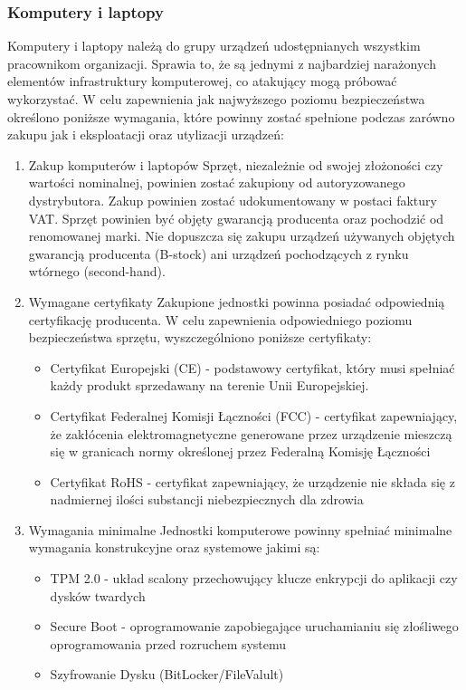 \documentclass[12pt,a4paper]{article}
\begin{document}
\subsubsection{Komputery i laptopy}\label{komputery-i-laptopy}
Komputery i laptopy należą do grupy urządzeń udostępnianych wszystkim pracownikom organizacji. Sprawia to, że są jednymi z najbardziej narażonych elementów infrastruktury komputerowej, co atakujący mogą próbować wykorzystać. W celu zapewnienia jak najwyższego poziomu bezpieczeństwa określono poniższe wymagania, które powinny zostać spełnione podczas zarówno zakupu jak i eksploatacji oraz utylizacji urządzeń:
\begin{enumerate}
    \item Zakup komputerów i laptopów Sprzęt, niezależnie od swojej złożoności czy wartości nominalnej, powinien zostać zakupiony od autoryzowanego dystrybutora. Zakup powinien zostać udokumentowany w postaci faktury VAT. Sprzęt powinien być objęty gwarancją producenta oraz pochodzić od renomowanej marki. Nie dopuszcza się zakupu urządzeń używanych objętych gwarancją producenta (B-stock) ani urządzeń pochodzących z rynku wtórnego (second-hand).
    
    \item Wymagane certyfikaty Zakupione jednostki powinna posiadać odpowiednią certyfikację producenta. W celu zapewnienia odpowiedniego poziomu bezpieczeństwa sprzętu, wyszczególniono poniższe certyfikaty:
        \begin{itemize}
            \item Certyfikat Europejski (CE) - podstawowy certyfikat, który musi spełniać każdy produkt sprzedawany na terenie Unii Europejskiej.
            \item Certyfikat Federalnej Komisji Łączności (FCC) - certyfikat zapewniający, że zakłócenia elektromagnetyczne generowane przez urządzenie mieszczą się w granicach normy określonej przez Federalną Komisję Łączności
            \item Certyfikat RoHS - certyfikat zapewniający, że urządzenie nie składa się z nadmiernej ilości substancji niebezpiecznych dla zdrowia
        \end{itemize}

    \item Wymagania minimalne Jednostki komputerowe powinny spełniać minimalne wymagania konstrukcyjne oraz systemowe jakimi są:
        \begin{itemize}
            \item TPM 2.0 - układ scalony przechowujący klucze enkrypcji do aplikacji czy dysków twardych
            \item Secure Boot - oprogramowanie zapobiegające uruchamianiu się złośliwego oprogramowania przed rozruchem systemu
            \item Szyfrowanie Dysku (BitLocker/FileValult)
        \end{itemize}


\end{enumerate}
\end{document}
